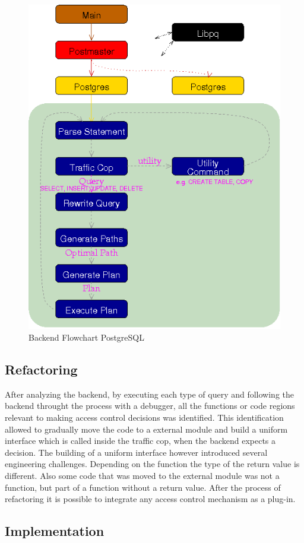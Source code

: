 %
\begin{figure}[!ht]
  \centering
    \includegraphics[width=1\textwidth]{img/backend_flowchart.png}
    \caption{Backend Flowchart PostgreSQL \protect \footnotemark}
\end{figure}
%
%
\FloatBarrier
%
\subsection{Refactoring}
%
After analyzing the backend, by executing each type of query and following the backend throught the process with a debugger, all the functions or code regions relevant to making access control decisions was identified.
%
This identification allowed to gradually move the code to a external module and build a uniform interface which is called inside the traffic cop, when the backend expects a decision.
%
The building of a uniform interface however introduced several engineering challenges.
%
Depending on the function the type of the return value is different. Also some code that was moved to the external module was not a function, but part of a function without a return value.
%
%
After the process of refactoring it is possible to integrate any access control mechanism as a plug-in.
%

%
\subsection{Implementation}